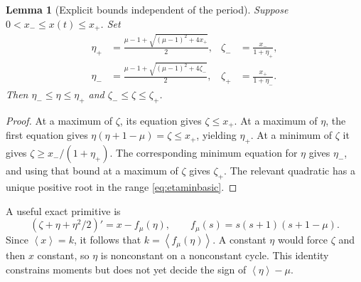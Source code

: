 \documentclass[11pt,a4paper]{article}
\numberwithin{equation}{section}
\newtheorem{lemma}[theorem]{Lemma}
\theoremstyle{remark}\newtheorem{remark}[theorem]{Remark}
\newcommand{\avg}[1]{\left\langle #1\right\rangle}
\begin{document}
\begin{lemma}[Explicit bounds independent of the period]\label{lem:projectivebounds}
Suppose $0<x_-\le x(t)\le x_+$. Set
\begin{align*}
\eta_+&=\frac{\mu-1+\sqrt{(\mu-1)^2+4x_+}}2,&
\zeta_-&=\frac{x_-}{1+\eta_+},\\
\eta_-&=\frac{\mu-1+\sqrt{(\mu-1)^2+4\zeta_-}}2,&
\zeta_+&=\frac{x_+}{1+\eta_-}.
\end{align*}
Then $\eta_-\le\eta\le\eta_+$ and $\zeta_-\le\zeta\le\zeta_+$.
\end{lemma}
\begin{proof}
At a maximum of $\zeta$, its equation gives $\zeta\le x_+$. At a maximum of $\eta$, the first equation gives $\eta(\eta+1-\mu)=\zeta\le x_+$, yielding $\eta_+$. At a minimum of $\zeta$ it gives $\zeta\ge x_-/(1+\eta_+)$. The corresponding minimum equation for $\eta$ gives $\eta_-$, and using that bound at a maximum of $\zeta$ gives $\zeta_+$. The relevant quadratic has a unique positive root in the range \eqref{eq:etaminbasic}.
\end{proof}

A useful exact primitive is
\begin{equation}\label{eq:gainprimitive}
(\zeta+\eta+\eta^2/2)'=x-f_\mu(\eta),\qquad
f_\mu(s)=s(s+1)(s+1-\mu).
\end{equation}
Since $\avg x=k$, it follows that $k=\avg{f_\mu(\eta)}$. A constant $\eta$ would force $\zeta$ and then $x$ constant, so $\eta$ is nonconstant on a nonconstant cycle. This identity constrains moments but does not yet decide the sign of $\avg\eta-\mu$.
\end{document}
